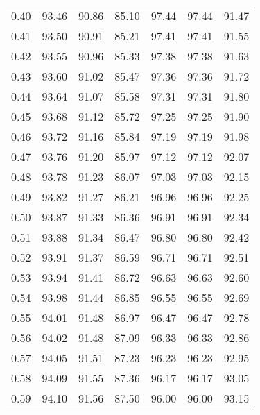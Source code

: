 \begin{tabular}{|c|c|c|c|c|c|c|}
      0.40 &     93.46 &     90.86 &      85.10 &   97.44 &      97.44 &         91.47 \\
      0.41 &     93.50 &     90.91 &      85.21 &   97.41 &      97.41 &         91.55 \\
      0.42 &     93.55 &     90.96 &      85.33 &   97.38 &      97.38 &         91.63 \\
      0.43 &     93.60 &     91.02 &      85.47 &   97.36 &      97.36 &         91.72 \\
      0.44 &     93.64 &     91.07 &      85.58 &   97.31 &      97.31 &         91.80 \\
      0.45 &     93.68 &     91.12 &      85.72 &   97.25 &      97.25 &         91.90 \\
      0.46 &     93.72 &     91.16 &      85.84 &   97.19 &      97.19 &         91.98 \\
      0.47 &     93.76 &     91.20 &      85.97 &   97.12 &      97.12 &         92.07 \\
      0.48 &     93.78 &     91.23 &      86.07 &   97.03 &      97.03 &         92.15 \\
      0.49 &     93.82 &     91.27 &      86.21 &   96.96 &      96.96 &         92.25 \\
      0.50 &     93.87 &     91.33 &      86.36 &   96.91 &      96.91 &         92.34 \\
      0.51 &     93.88 &     91.34 &      86.47 &   96.80 &      96.80 &         92.42 \\
      0.52 &     93.91 &     91.37 &      86.59 &   96.71 &      96.71 &         92.51 \\
      0.53 &     93.94 &     91.41 &      86.72 &   96.63 &      96.63 &         92.60 \\
      0.54 &     93.98 &     91.44 &      86.85 &   96.55 &      96.55 &         92.69 \\
      0.55 &     94.01 &     91.48 &      86.97 &   96.47 &      96.47 &         92.78 \\
      0.56 &     94.02 &     91.48 &      87.09 &   96.33 &      96.33 &         92.86 \\
      0.57 &     94.05 &     91.51 &      87.23 &   96.23 &      96.23 &         92.95 \\
      0.58 &     94.09 &     91.55 &      87.36 &   96.17 &      96.17 &         93.05 \\
      0.59 &     94.10 &     91.56 &      87.50 &   96.00 &      96.00 &         93.15 \\

\end{tabular}
